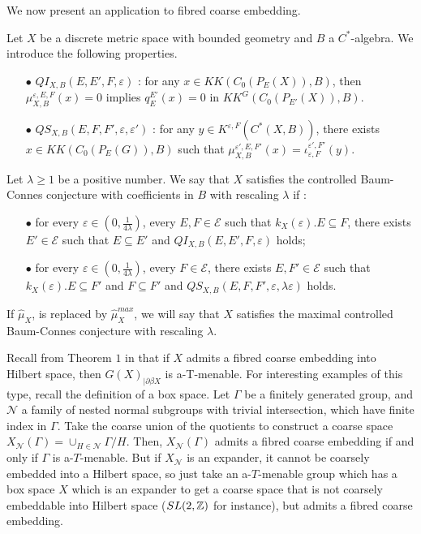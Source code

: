 We now present an application to fibred coarse embedding.

\begin{definition}
Let $X$ be a discrete metric space with bounded geometry and $B$ a $C^*$-algebra. We introduce the following properties.\\
\begin{itemize} 
\item[$\bullet$] $QI_{X,B}(E,E',F,\varepsilon)$ : for any $x\in KK(C_0(P_E(X)), B )$, then $\mu^{\varepsilon,E,F}_{X,B}(x) = 0$ implies $q_E^{E'}(x)=0$ in $KK^G(C_0(P_{E'}(X)),B)$.
\item[$\bullet$] $QS_{X,B}(E,F,F',\varepsilon,\varepsilon')$ : for any $y\in K^{\varepsilon,F}(C^*(X,B))$, there exists $x\in KK(C_0(P_E(G)),B)$ such that $\mu^{\varepsilon',E,F'}_{X,B}(x)=\iota_{\varepsilon,F}^{\varepsilon',F'}(y)$.\\
\end{itemize} 
Let $\lambda \geq 1$ be a positive number. We say that $X$ satisfies the controlled Baum-Connes conjecture with coefficients in $B$ with rescaling $\lambda$ if :
\begin{itemize} 
\item[$\bullet$] for every $\varepsilon \in (0,\frac{1}{4\lambda})$, every $E,F\in\mathcal E$ such that $k_X(\varepsilon).E\subseteq F$, there exists $E'\in \mathcal E$ such that $E \subseteq E'$ and $ QI_{X,B}(E,E',F,\varepsilon)$ holds; 
\item[$\bullet$] for every $\varepsilon \in (0,\frac{1}{4\lambda})$, every $F\in\mathcal E$, there exists $E,F'\in\mathcal E$ such that $k_X(\varepsilon).E \subseteq F'$ and $F\subseteq F'$ and $QS_{X,B}(E,F,F',\varepsilon,\lambda\varepsilon)$ holds. 
\end{itemize} 
If $\hat\mu_{X}$, is replaced by $\hat\mu^{max}_{X}$, we will say that $X$ satisfies the maximal controlled Baum-Connes conjecture with rescaling $\lambda$.\\
\end{definition}

Recall from Theorem $1$ in \cite{FinnSellFibred} that if $X$ admits a fibred coarse embedding into Hilbert space, then $G(X)_{|\partial \beta X}$ is a-T-menable. For interesting examples of this type, recall the definition of a box space. Let $\Gamma$ be a finitely generated group, and $\mathcal N$ a family of nested normal subgroups with trivial intersection, which have finite index in $\Gamma$. Take the coarse union of the quotients to construct a coarse space $X_{\mathcal N}(\Gamma)= \cup_{H\in \mathcal N } \Gamma/ H$. Then, $X_{\mathcal N}(\Gamma)$ admits a fibred coarse embedding if and only if $\Gamma$ is a-$T$-menable. But if $X_{\mathcal N}$ is an expander, it cannot be coarsely embedded into a Hilbert space, so just take an a-$T$-menable group which has a box space $X$ which is an expander to get a coarse space that is not coarsely embeddable into Hilbert space ($SL(2,\mathbb Z)$ for instance), but admits a fibred coarse embedding.\\

